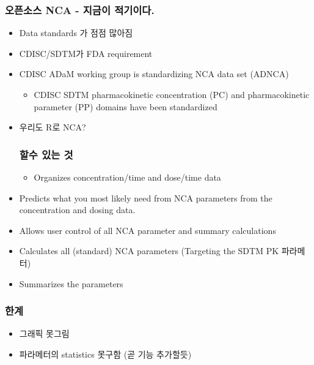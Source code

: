 \documentclass[]{krantz}
\providecommand{\tightlist}{%
  \setlength{\itemsep}{0pt}\setlength{\parskip}{0pt}}
\theoremstyle{definition}
\theoremstyle{definition}
\theoremstyle{definition}
\theoremstyle{remark}
\begin{document}
\subsubsection{오픈소스 NCA - 지금이 적기이다.}\label{-nca----.}

\begin{itemize}
\item
  Data standards 가 점점 많아짐
\item
  CDISC/SDTM가 FDA requirement
\item
  CDISC ADaM working group is standardizing NCA data set (ADNCA)
  \textbar{}

  \begin{itemize}
  \tightlist
  \item
    CDISC SDTM pharmacokinetic concentration (PC) and pharmacokinetic
    parameter (PP) domains have been standardized
  \end{itemize}
\item
  우리도 R로 NCA?

  \subsubsection{할수 있는 것}\label{--}

  \begin{itemize}
  \tightlist
  \item
    Organizes concentration/time and dose/time data
  \end{itemize}
\item
  Predicts what you most likely need from NCA parameters from the
  concentration and dosing data.
\item
  Allows user control of all NCA parameter and summary calculations
\item
  Calculates all (standard) NCA parameters (Targeting the SDTM PK
  파라메터)
\item
  Summarizes the parameters
\end{itemize}

\subsubsection{한계}

\begin{itemize}
\tightlist
\item
  그래픽 못그림
\item
  파라메터의 statistics 못구함 (곧 기능 추가할듯)
\end{itemize}
\end{document}
